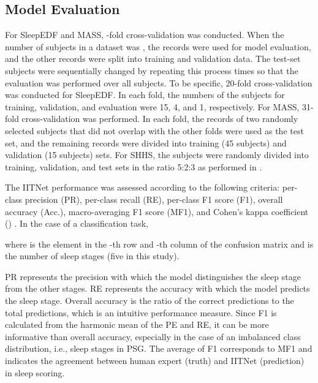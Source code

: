 \documentclass[10pt,twocolumn,twoside]{IEEEtran}
\begin{document}
    \subsection{Model Evaluation}
    For SleepEDF and MASS, -fold cross-validation was conducted. When the number of subjects in a dataset was , the  records were used for model evaluation, and the other records were split into training and validation data. The test-set subjects were sequentially changed by repeating this process  times so that the evaluation was performed over all subjects. To be specific, 20-fold cross-validation was conducted for SleepEDF. In each fold, the numbers of the subjects for training, validation, and evaluation were 15, 4, and 1, respectively. For MASS, 31-fold cross-validation was performed. In each fold, the records of two randomly selected subjects that did not overlap with the other folds were used as the test set, and the remaining records were divided into training (45 subjects) and validation (15 subjects) sets. For SHHS, the subjects were randomly divided into training, validation, and test sets in the ratio 5:2:3 as performed in \cite{sors2018convolutional}.
    
    The IITNet performance was assessed according to the following criteria: per-class precision (PR), per-class recall (RE), per-class F1 score (F1), overall accuracy (Acc.), macro-averaging F1 score (MF1), and Cohen's kappa coefficient () \cite{cohen1960coefficient}\cite{sokolova2009systematic}. In the case of a classification task, 
    
    
    
    
    where  is the element in the -th row and -th column of the confusion matrix and  is the number of sleep stages (five in this study).
    
    
    
    
    
    
    
    PR represents the precision with which the model distinguishes the sleep stage from the other stages. RE represents the accuracy with which the model predicts the sleep stage. Overall accuracy is the ratio of the correct predictions to the total predictions, which is an intuitive performance measure. Since F1 is calculated from the harmonic mean of the PE and RE, it can be more informative than overall accuracy, especially in the case of an imbalanced class distribution, i.e., sleep stages in PSG. The average of F1 corresponds to MF1 and  indicates the agreement between human expert (truth) and IITNet (prediction) in sleep scoring.
	
\end{document}
